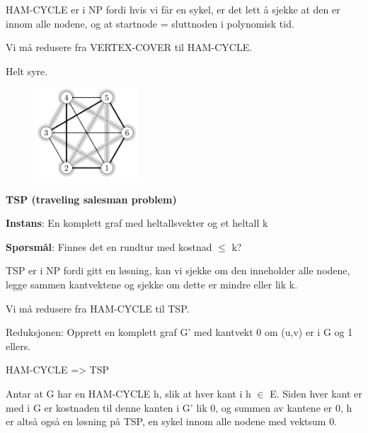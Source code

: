 \documentclass[12pt]{report}
\begin{document}
\vspace{\baselineskip}
HAM-CYCLE er i NP fordi hvis vi får en sykel, er det lett å sjekke at den er innom alle nodene, og at startnode = sluttnoden i polynomisk tid. \par

Vi må redusere fra VERTEX-COVER til HAM-CYCLE.\par

Helt syre.\par




\begin{figure}[H]
\advance\leftskip 5.42in		\includegraphics[width=1.53in,height=1.34in]{./media/image164.png}
\end{figure}



\textbf{TSP (traveling salesman problem)}\par

\textbf{Instans}: En komplett graf med heltallsvekter og et heltall k\par

\textbf{Spørsmål}: Finnes det en rundtur med kostnad $ \leq $  k?\par


\vspace{\baselineskip}
TSP er i NP fordi gitt en løsning, kan vi sjekke om den inneholder alle nodene, legge sammen kantvektene og sjekke om dette er mindre eller lik k. \par

Vi må redusere fra HAM-CYCLE til TSP.\par

Reduksjonen: Opprett en komplett graf G’ med kantvekt 0 om (u,v) er i G og 1 ellers. \par

HAM-CYCLE => TSP\par

Antar at G har en HAM-CYCLE h, slik at hver kant i h $ \in $  E. Siden hver kant er med i G er kostnaden til denne kanten i G’ lik 0, og summen av kantene er 0, h er altså også en løsning på TSP, en sykel innom alle nodene med vektsum 0.\par
\end{document}
